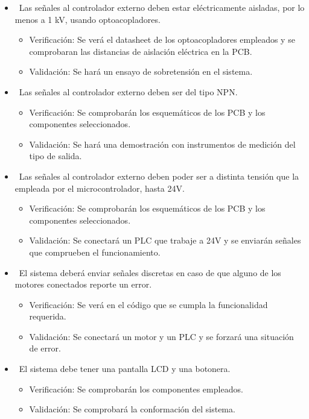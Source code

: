 \documentclass[
11pt, %
]{charter}
\begin{document}
\begin{itemize}
\begin{itemize}
	\end{itemize}
	\item \REQ ~Las señales al controlador externo deben estar eléctricamente aisladas, por lo menos a 1 kV, usando optoacopladores.
	\begin{itemize}
		\item Verificación: Se verá el datasheet de los optoacopladores empleados y se comprobaran las distancias de aislación eléctrica en la PCB.
		\item Validación: Se hará un ensayo de sobretensión en el sistema.
	\end{itemize}
	\item \REQ ~Las señales al controlador externo deben ser del tipo NPN.
	\begin{itemize}
		\item Verificación: Se comprobarán los esquemáticos de los PCB y los componentes seleccionados.
		\item Validación: Se hará una demostración con instrumentos de medición del tipo de salida.
	\end{itemize}
	\item \REQ ~Las señales al controlador externo deben poder ser a distinta tensión que la empleada por el microcontrolador, hasta 24V.
	\begin{itemize}
		\item Verificación: Se comprobarán los esquemáticos de los PCB y los componentes seleccionados.
		\item Validación: Se conectará un PLC que trabaje a 24V y se enviarán señales que comprueben el funcionamiento.
	\end{itemize}
	\item \REQ ~El sistema deberá enviar señales discretas en caso de que alguno de los motores conectados reporte un error.
	\begin{itemize}
		\item Verificación: Se verá en el código que se cumpla la funcionalidad requerida.
		\item Validación: Se conectará un motor y un PLC y se forzará una situación de error.
	\end{itemize}
	\item \REQ ~El sistema debe tener una pantalla LCD y una botonera.
	\begin{itemize}
		\item Verificación: Se comprobarán los componentes empleados.
		\item Validación: Se comprobará la conformación del sistema.

\end{itemize}
\end{itemize}
\end{document}

